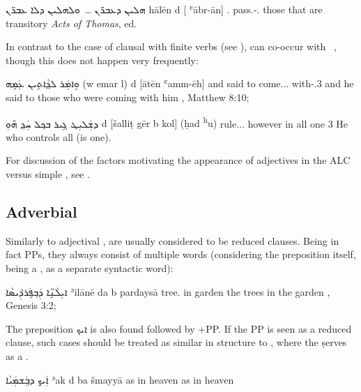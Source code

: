 {{{{
{ܗܠܝܢ ܕܥܒܪ̈ܢ \ldots\ ܘܠܗܠܝܢ ܕܠܐ ܥܒܪ̈ܢ}
{hālēn d\cb{} [ ʿābr-ān]}
{\dem.\pl{} \lnk\cb{} \opt\neg{} pass.\ptcp-\abs.\fpl}
{those that are  transitory}
{\textit{Acts of Thomas}, ed.\ \cite[]{WrightActs}}

In contrast to the case of clausal \secns with finite verbs (see ),   \secns can co-occur with \zero\ \prims, though this does not happen very frequently:

{ܘܸܐܡܲܪ ܠܕ݂ܵܐܬܹܝܢ ܥܲܡܹܗ}
{(w\cb{} emar l\cb{}) \zero{} d\cb{} [ātēn ʿamm-ēh]}
{and\cb{} said to\cb{} \zero{} \lnk\cb{} come.\ptcp.\abs.\mpl{} with-\poss.3\masc}
{and he said to those who were coming with him}
{\Pesh, Matthew 8:10; \cite[87, \S 111]{MuraokaSyriac}}

{ܕܫܲܠܝܼܛ ܓܹܝܪ ܒܟ݂ܠ ܚܲܕ݂ ܗ̄ܘܼ}
{\zero{} d\cb{} [šalliṭ gēr b\cb{} kol] (ḥad \cb{}\textsuperscript{h}u)}
{\zero{} \lnk\cb{} rule.\ptcp.\masc.\abs{} however in\cb{} all one \cb{}3\masc}
{He who controls all (is one).}
{\cite[87, \S 111]{MuraokaSyriac}}

For discussion of the factors motivating the appearance of adjectives in the ALC versus simple , see .
 

\subsection{Adverbial \secns}

Similarly to adjectival \secns,  \secns are usually considered to be reduced clauses. Being in fact PPs, they always consist of multiple words (considering the preposition itself, being a , as a separate syntactic word):

{ܐܝܼܠܵܢܹ̈ܐ ܕܲܒ݂ܦ݂ܲܪܕ݁ܲܝܣܵܐ}
{ʾilānē da\cb{} b\cb{} pardaysā}
{tree.\pl{} \lnk\cb{} in\cb{} garden}
{the trees in the garden}
{\Pesh, Genesis 3:2; \cite[72]{MuraokaSyriac}}

 
The preposition \textsyriac{ܐܝܟ}  is also found
followed by \D+PP. If the PP is seen as a  reduced clause, such cases should be treated as similar in structure to , where the \d serves as a \comp*.

{ܐܲܝܟ݂ ܕܒ݂ܲܫܡܲܝܵܐ}
{ʾak d\cb{} ba\cb{} šmayyā}
{as  \lnkcomp\cb{} in\cb{} heaven}
{as in heaven}
{\cite[64, \S 78]{MuraokaSyriac}}

}}}}
